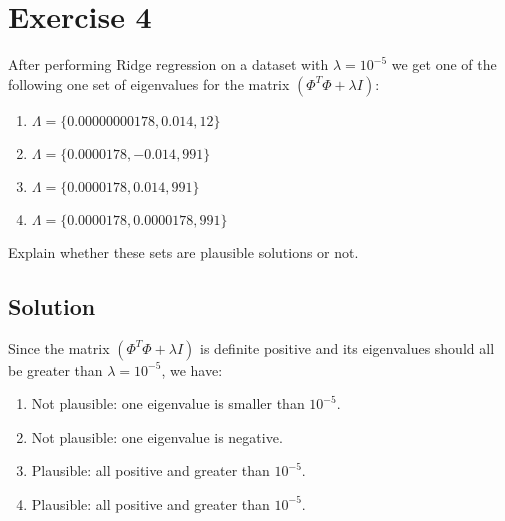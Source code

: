 \section{Exercise 4}

After performing Ridge regression on a dataset with $\lambda = 10^{-5}$ we get one of the following one set of eigenvalues for the matrix $\left(\Phi^T \Phi + \lambda I\right)$:
\begin{enumerate}
    \item $\Lambda = \{0.00000000178, 0.014, 12\}$
    \item $\Lambda = \{0.0000178, -0.014, 991\}$
    \item $\Lambda = \{0.0000178, 0.014, 991\}$
    \item $\Lambda = \{0.0000178, 0.0000178, 991\}$
\end{enumerate}
Explain whether these sets are plausible solutions or not.

\subsection*{Solution}
Since the matrix $\left(\Phi^T \Phi + \lambda I\right)$ is definite positive and its eigenvalues should all be greater than $\lambda = 10^{-5}$, we have:
\begin{enumerate}
    \item Not plausible: one eigenvalue is smaller than $10^{-5}$.
    \item Not plausible: one eigenvalue is negative.
    \item Plausible: all positive and greater than $10^{-5}$.
    \item Plausible: all positive and greater than $10^{-5}$.
\end{enumerate}
